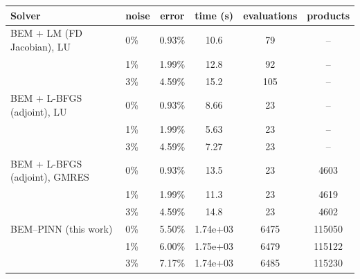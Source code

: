 \begin{tabular}{llcccc}
\toprule
Solver & noise & error & time (s) & evaluations & products\\
\midrule
BEM + LM (FD Jacobian), LU & 0\% & 0.93\% & 10.6 & 79 & --\\
 & 1\% & 1.99\% & 12.8 & 92 & --\\
 & 3\% & 4.59\% & 15.2 & 105 & --\\
\addlinespace
BEM + L-BFGS (adjoint), LU & 0\% & 0.93\% & 8.66 & 23 & --\\
 & 1\% & 1.99\% & 5.63 & 23 & --\\
 & 3\% & 4.59\% & 7.27 & 23 & --\\
\addlinespace
BEM + L-BFGS (adjoint), GMRES & 0\% & 0.93\% & 13.5 & 23 & 4603\\
 & 1\% & 1.99\% & 11.3 & 23 & 4619\\
 & 3\% & 4.59\% & 14.8 & 23 & 4602\\
\addlinespace
BEM--PINN (this work) & 0\% & 5.50\% & 1.74e+03 & 6475 & 115050\\
 & 1\% & 6.00\% & 1.75e+03 & 6479 & 115122\\
 & 3\% & 7.17\% & 1.74e+03 & 6485 & 115230\\
\bottomrule
\end{tabular}
